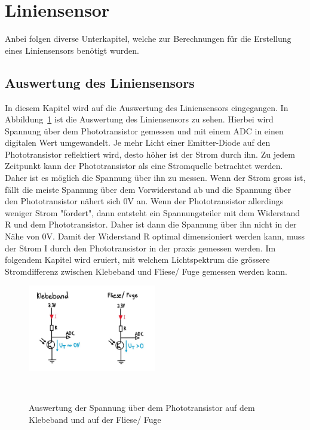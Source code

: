 \documentclass[main.tex]{subfiles} %
\begin{document}

\section{Liniensensor}
Anbei folgen diverse Unterkapitel, welche zur Berechnungen für die Erstellung eines Liniensensors benötigt wurden.

\subsection{Auswertung des Liniensensors}
In diesem Kapitel wird auf die Auswertung des Liniensensors eingegangen. In Abbildung~\ref{fig:Auswertung_Liniensensor} ist die
Auswertung des Liniensensors zu sehen. Hierbei wird Spannung über dem Phototransistor gemessen und mit einem ADC in einen digitalen
Wert umgewandelt. Je mehr Licht einer Emitter-Diode auf den Phototransistor reflektiert wird, desto höher ist der Strom durch ihn. Zu jedem
Zeitpunkt kann der Phototransistor als eine Stromquelle betrachtet werden. Daher ist es möglich die Spannung über ihn zu messen. Wenn der Strom
gross ist, fällt die meiste Spannung über dem Vorwiderstand ab und die Spannung über den Phototransistor nähert sich 0V an. Wenn der Phototransistor
allerdings weniger Strom "fordert", dann entsteht ein Spannungsteiler mit dem Widerstand R und dem Phototransistor. Daher ist dann die Spannung über ihn nicht in
der Nähe von 0V. Damit der Widerstand R optimal dimensioniert werden kann, muss der Strom I durch den Phototransistor in der praxis gemessen
werden. Im folgendem Kapitel wird  eruiert, mit welchem Lichtspektrum die grössere Stromdifferenz zwischen Klebeband und Fliese/ Fuge gemessen werden kann.


\begin{figure}[h!]
    \centering
    \includegraphics[width=0.5\textwidth]{./fig_Liniensensor/Auswertung_Liniensensor}
    \caption{Auswertung der Spannung über dem Phototransistor auf dem Klebeband und auf der Fliese/ Fuge}~\label{fig:Auswertung_Liniensensor}
\end{figure}
\end{document}
